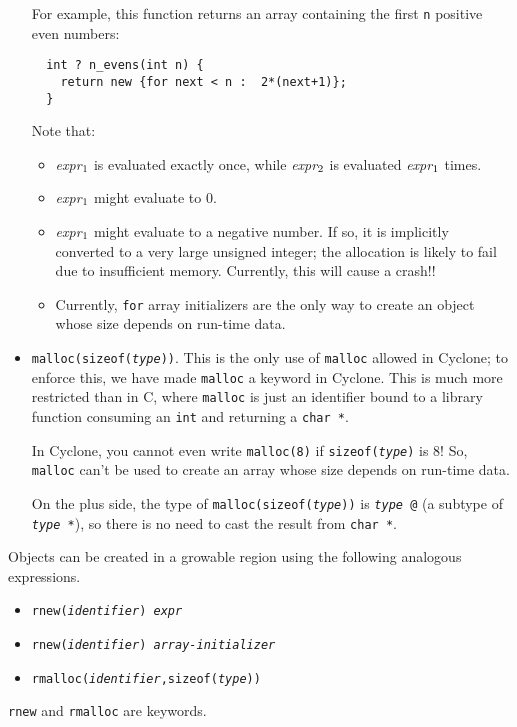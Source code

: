 \begin{itemize}
  For example, this function returns an array containing the first
  \texttt{n} positive even numbers:
\begin{verbatim}
  int ? n_evens(int n) {
    return new {for next < n :  2*(next+1)};
  }
\end{verbatim}

  Note that:
  \begin{itemize}
  \item {\it expr}\(\sb{1}\) is evaluated exactly once, while {\it
      expr}\(\sb{2}\) is evaluated {\it expr}\(\sb{1}\) times.
  \item {\it expr}\(\sb{1}\) might evaluate to 0.
  \item {\it expr}\(\sb{1}\) might evaluate to a negative number.
    If so, it is implicitly converted to a very large unsigned
    integer; the allocation is likely to fail due to insufficient
    memory.  Currently, this will cause a crash!!
  \item Currently, \texttt{for} array initializers are the only way to
    create an object whose size depends on run-time data.
  \end{itemize}
  
\item \texttt{malloc(sizeof({\it type}))}.  This is the only use of
  \texttt{malloc} allowed in Cyclone; to enforce this, we have made
  \texttt{malloc} a keyword in Cyclone.  This is much more restricted
  than in C, where \texttt{malloc} is just an identifier bound to a
  library function consuming an \texttt{int} and returning a
  \texttt{char *}.

  In Cyclone, you cannot even write \texttt{malloc(8)} if
  \texttt{sizeof({\it type})} is 8!  So, \texttt{malloc} can't be used
  to create an array whose size depends on run-time data.
  
  On the plus side, the type of \texttt{malloc(sizeof({\it type}))} is
  \texttt{{\it type} @} (a subtype of \texttt{{\it type} *}),
  so there is no need to cast the result from \texttt{char *}.
\end{itemize}

Objects can be created in a growable region using the following analogous
expressions.
\begin{itemize}
\item \texttt{rnew({\it identifier}) {\it expr}}
\item \texttt{rnew({\it identifier}) {\it array-initializer}}
\item \texttt{rmalloc({\it identifier},sizeof({\it type}))}
\end{itemize}
\texttt{rnew} and \texttt{rmalloc} are keywords.

